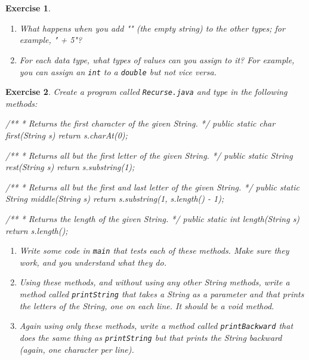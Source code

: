 \documentclass[12pt]{book}
\theoremstyle{exercise}
\newtheorem{exercise}{Exercise}[chapter]
\newcommand{\java}[1]{\verb"#1"}
\newcommand{\java}[1]{\lstinline{#1}} %
\begin{document}
\begin{exercise}
\begin{enumerate}
\item What happens when you add \java{""} (the empty string) to the other types; for example, \java{"" + 5}?

\item For each data type, what types of values can you assign to it?
For example, you can assign an \java{int} to a \java{double} but not vice versa.

\end{enumerate}

\end{exercise}


\begin{exercise}

Create a program called {\tt Recurse.java} and type in the following methods:

\begin{code}
    /**
     * Returns the first character of the given String.
     */
    public static char first(String s) {
        return s.charAt(0);
    }

    /**
     * Returns all but the first letter of the given String.
     */
    public static String rest(String s) {
        return s.substring(1);
    }

    /**
     * Returns all but the first and last letter of the given String.
     */
    public static String middle(String s) {
        return s.substring(1, s.length() - 1);
    }

    /**
     * Returns the length of the given String.
     */
    public static int length(String s) {
        return s.length();
    }
\end{code}

\begin{enumerate}

\item Write some code in \java{main} that tests each of these methods.
Make sure they work, and you understand what they do.

\item Using these methods, and without using any other String methods, write a method called \java{printString} that takes a String as a parameter and that prints the letters of the String, one on each line.
It should be a void method.

\item Again using only these methods, write a method called \java{printBackward} that does the same thing as \java{printString} but that prints the String backward (again, one character per line).


\end{enumerate}
\end{exercise}
\end{document}
